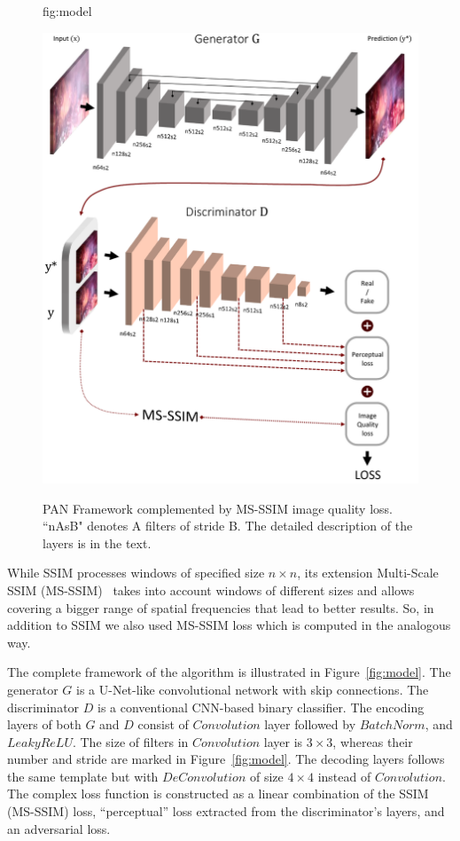 \documentclass[pmlr]{jmlr}
\begin{document}
\begin{figure}[t!]
\floatconts
{fig:model}
{\caption{PAN Framework complemented by MS-SSIM image quality loss. ``nAsB" denotes A filters of stride B. The detailed description of the layers is in the text.}}
{\includegraphics[width=1\linewidth]{fig2}}
\end{figure}



While SSIM processes windows of specified size $n\times n$, its extension Multi-Scale SSIM (MS-SSIM)~\citep{zhang2012comprehensive} takes into account windows of different sizes and allows covering a bigger range of spatial frequencies that lead to better results. So, in addition to SSIM we also used MS-SSIM loss which is computed in the analogous way. 

The complete framework of the algorithm is illustrated in Figure~\ref{fig:model}. The generator $G$ is a U-Net-like convolutional network with skip connections. The discriminator $D$ is a conventional CNN-based binary classifier. The encoding layers of both $G$ and $D$ consist of $Convolution$ layer followed by $BatchNorm$, and $LeakyReLU$. The size of filters in $Convolution$ layer is $3\times3$, whereas their number and stride are marked in Figure~\ref{fig:model}. The decoding layers follows the same template but with $DeConvolution$ of size $4\times4$ instead of $Convolution$. The complex loss function is constructed as a linear combination of the SSIM (MS-SSIM) loss, “perceptual” loss extracted from the discriminator's layers, and an adversarial loss. 
\end{document}
